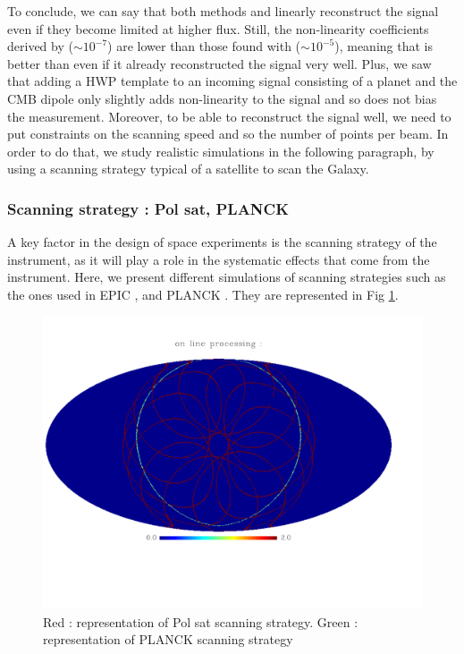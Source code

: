 To conclude, we can say that both methods \rf and \cf linearly reconstruct the signal even if they become limited at higher flux. Still, the non-linearity coefficients derived by \cf ($\sim 10^{-7}$) are lower than those found with \rf ($\sim 10^{-5}$), meaning that \cf is better than \rf even if it already reconstructed the signal very well.
Plus, we saw that adding a HWP template to an incoming signal consisting of a planet and the CMB dipole only slightly adds non-linearity to the signal and so does not bias the measurement. Moreover, to be able to reconstruct the signal well, we need to put constraints on the scanning speed and so the number of points per beam. In order to do that, we study realistic simulations in the following paragraph, by using a scanning strategy typical of a satellite to scan the Galaxy.
		
\subsubsection{Scanning strategy : Pol sat, PLANCK}
A key factor in the design of space experiments is the scanning strategy of the instrument, as it will play a role in the systematic effects that come from the instrument. Here, we present different simulations of scanning strategies such as the ones used in EPIC \citep{2009arXiv0906.1188B}, and PLANCK \citep{2005A&A...430..363D}. They are represented in Fig \ref{fig:strat-polsat-planck}.

\begin{figure}[h]
\center
	\includegraphics[scale=0.3]{Figures/scan_strat_planck_polsat.pdf}
	\caption{Red : representation of Pol sat scanning strategy. Green : representation of PLANCK scanning strategy }
	\label{fig:strat-polsat-planck}
\end{figure}

